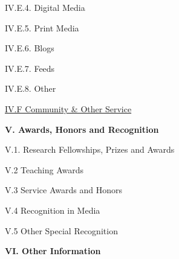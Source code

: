 \documentclass[11pt,letterpaper]{article}
\begin{document}
IV.E.4. Digital Media

IV.E.5. Print Media 

IV.E.6. Blogs

IV.E.7. Feeds

IV.E.8. Other


\underline{IV.F Community \& Other Service}


\textbf{V. Awards, Honors and Recognition}

V.1. Research Fellowships, Prizes and Awards

V.2 Teaching Awards

V.3 Service Awards and Honors

V.4 Recognition in Media 

V.5 Other Special Recognition


\textbf{VI. Other Information}
\end{document}
